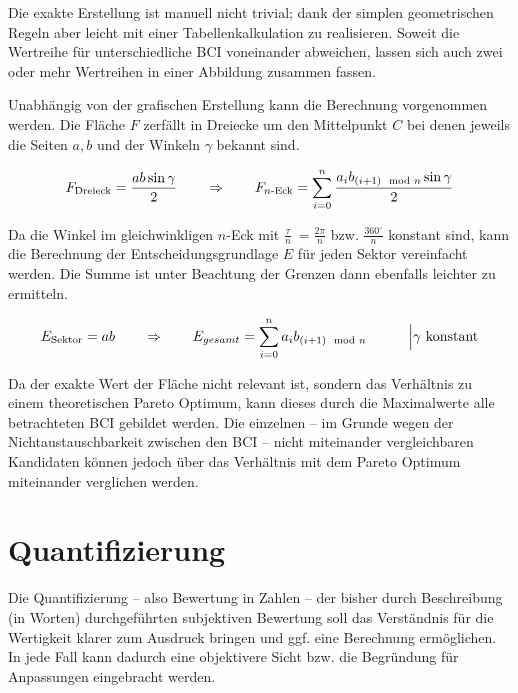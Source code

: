 Die exakte Erstellung ist manuell nicht trivial; dank der simplen geometrischen Regeln aber leicht mit \ua{} einer Tabellenkalkulation zu realisieren.
Soweit die Wertreihe für unterschiedliche \gls{BCI} voneinander abweichen, lassen sich auch zwei oder mehr Wertreihen in einer Abbildung zusammen fassen.

Unabhängig von der grafischen Erstellung kann die Berechnung vorgenommen werden.
Die Fläche \(F\) zerfällt in Dreiecke um den Mittelpunkt \(C\) bei denen jeweils die Seiten \(a, b\) und der Winkeln \(\gamma\) bekannt sind.

\[
F_{\text{Dreieck}} = \frac{ab\sin{\gamma}}{2}
\text{\hspace{2em}}\Rightarrow{}\text{\hspace{2em}}
F_{n\text{-Eck}} = \sum_{i=0}^{n} \frac{a_{i} b_{(i+1)\mod n} \sin{\gamma}}{2}
\]

Da die Winkel im gleichwinkligen \(n\)-Eck mit %
\( \frac{\tau}{n}\ = \frac{2\pi}{n}\) bzw. \(\frac{360^\circ{}}{n}\) konstant sind,
kann die Berechnung der Entscheidungsgrundlage \(E\) für jeden Sektor vereinfacht werden.
Die Summe ist unter Beachtung der Grenzen dann ebenfalls leichter zu ermitteln.

\[
E_{\text{Sektor}} = ab 
\text{\hspace{2em}}\Rightarrow{}\text{\hspace{2em}}
E_{gesamt} = \sum_{i=0}^{n} a_{i} b_{(i+1)\mod n}\text{\hspace{3em}}\Big|{\gamma \text{ konstant}}
\]

Da der exakte Wert der Fläche nicht relevant ist, sondern das Verhältnis zu einem theoretischen Pareto Optimum,
kann dieses durch die Maximalwerte alle betrachteten \gls{BCI} gebildet werden.
Die einzelnen -- im Grunde wegen der Nichtaustauschbarkeit zwischen den \gls{BCI} -- nicht miteinander vergleichbaren
Kandidaten können jedoch über das Verhältnis mit dem Pareto Optimum miteinander verglichen werden.



\section{Quantifizierung}

Die Quantifizierung -- also Bewertung in Zahlen -- der bisher durch Beschreibung (in Worten) durchgeführten subjektiven Bewertung soll das Verständnis für die Wertigkeit klarer zum Ausdruck bringen und ggf. eine Berechnung ermöglichen.
In jede Fall kann dadurch eine objektivere Sicht bzw. die Begründung für Anpassungen eingebracht werden.

